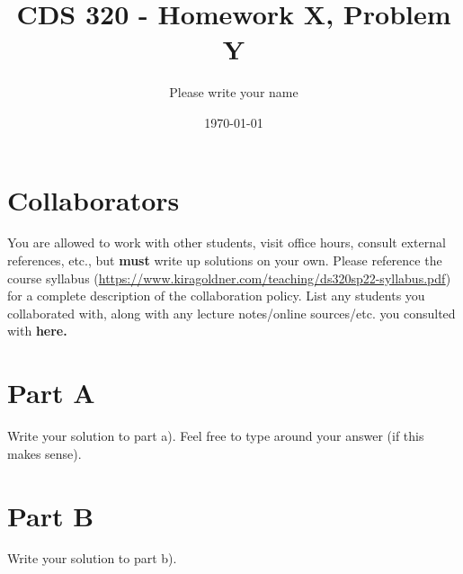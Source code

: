 \documentclass[12pt]{article}%
\begin{document}
\title{CDS 320 - Homework X, Problem Y} %
\author{Please write your name} %
\date{\today}
\maketitle
\section*{Collaborators}
You are allowed to work with other students, visit office hours, consult external references, etc., but \textbf{must} write up solutions on your own.  Please reference the course syllabus (\url{https://www.kiragoldner.com/teaching/ds320sp22-syllabus.pdf}) for a complete description of the collaboration policy. List any students you collaborated with, along with any lecture notes/online sources/etc. you consulted with \textbf{here.}

\section*{Part A}
Write your solution to part a). Feel free to type  around your answer (if this makes sense).
\section*{Part B}
Write your solution to part b).
\end{document}
